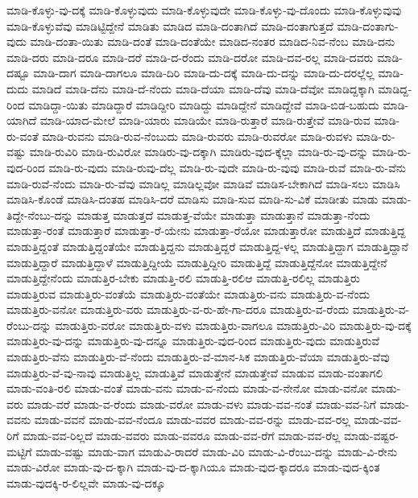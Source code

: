 {ಮಾಡಿ-ಕೊಳ್ಳು-ವು-ದಕ್ಕೆ
ಮಾಡಿ-ಕೊಳ್ಳುವುದು
ಮಾಡಿ-ಕೊಳ್ಳುವುದೇ
ಮಾಡಿ-ಕೊಳ್ಳು-ವು-ದೊಂದು
ಮಾಡಿ-ಕೊಳ್ಳುವುವು
ಮಾಡಿ-ಕೊಳ್ಳುವೆವು
ಮಾಡಿಟ್ಟಿದ್ದೇನೆ
ಮಾಡಿತು
ಮಾಡಿದ
ಮಾಡಿ-ದಂತಾಗಿದೆ
ಮಾಡಿ-ದಂತಾಗುತ್ತದೆ
ಮಾಡಿ-ದಂತಾಗು-ವುದು
ಮಾಡಿ-ದಂತಾ-ಯಿತು
ಮಾಡಿ-ದಂತೆ
ಮಾಡಿ-ದಂತೆಯೇ
ಮಾಡಿದ-ನಂತರ
ಮಾಡಿದ-ನಿವ-ನೆಂಬ
ಮಾಡಿ-ದನು
ಮಾಡಿ-ದರು
ಮಾಡಿ-ದರೂ
ಮಾಡಿ-ದರೆ
ಮಾಡಿ-ದ-ರೆಂದು
ಮಾಡಿ-ದರೋ
ಮಾಡಿ-ದವ-ರಲ್ಲ
ಮಾಡಿ-ದವರು
ಮಾಡಿ-ದಷ್ಟೂ
ಮಾಡಿ-ದಾಗ
ಮಾಡಿ-ದಾಗಲೂ
ಮಾಡಿ-ದಿರಿ
ಮಾಡಿ-ದು-ದಕ್ಕೆ
ಮಾಡಿ-ದು-ದನ್ನು
ಮಾಡಿ-ದು-ದರಲ್ಲೆಲ್ಲ
ಮಾಡಿ-ದುದು
ಮಾಡಿದೆ
ಮಾಡಿ-ದೆನು
ಮಾಡಿ-ದೆ-ನೆಂದು
ಮಾಡಿ-ದೆಯಾ
ಮಾಡಿ-ದೆವು
ಮಾಡಿ-ದೆವೋ
ಮಾಡಿದ್ದಕ್ಕಾಗಿ
ಮಾಡಿದ್ದ-ರಿಂದ
ಮಾಡಿದ್ದಾ-ಯಿತು
ಮಾಡಿದ್ದಾರೆ
ಮಾಡಿದ್ದೀರಿ
ಮಾಡಿದ್ದು
ಮಾಡಿದ್ದೇನೆ
ಮಾಡಿದ್ದೇವೆ
ಮಾಡಿ-ಬಿಡ-ಬಹುದು
ಮಾಡಿ-ಯಾಗಿದೆ
ಮಾಡಿ-ಯಾದ-ಮೇಲೆ
ಮಾಡಿ-ಯಾರು
ಮಾಡಿಯೇ
ಮಾಡಿ-ರುತ್ತಾರೆ
ಮಾಡಿ-ರುತ್ತೇವೆ
ಮಾಡಿ-ರುವ
ಮಾಡಿ-ರು-ವಂತೆ
ಮಾಡಿ-ರುವನು
ಮಾಡಿ-ರುವ-ನೆಂಬುದು
ಮಾಡಿ-ರುವರು
ಮಾಡಿ-ರುವರೋ
ಮಾಡಿ-ರುವಳು
ಮಾಡಿ-ರು-ವಷ್ಟು
ಮಾಡಿ-ರುವಿರಿ
ಮಾಡಿ-ರುವಿರೋ
ಮಾಡಿರು-ವು-ದಕ್ಕಾಗಿ
ಮಾಡಿರು-ವುದ-ಕ್ಕೆಲ್ಲಾ
ಮಾಡಿ-ರು-ವು-ದನ್ನು
ಮಾಡಿ-ರು-ವುದ-ರಿಂದ
ಮಾಡಿ-ರು-ವುದು
ಮಾಡಿ-ರುವು-ದೆಲ್ಲ
ಮಾಡಿ-ರು-ವುದೇ
ಮಾಡಿ-ರು-ವುವು
ಮಾಡಿ-ರುವೆ
ಮಾಡಿ-ರು-ವೆನು
ಮಾಡಿ-ರುವೆ-ನೆಂದು
ಮಾಡಿ-ರು-ವೆವು
ಮಾಡಿಲ್ಲ
ಮಾಡಿಲ್ಲವೋ
ಮಾಡಿವೆ
ಮಾಡಿಸ-ಬೇಕಾಗಿದೆ
ಮಾಡಿ-ಸಲು
ಮಾಡಿಸಿ
ಮಾಡಿಸಿ-ಕೊಂಡೆ
ಮಾಡಿಸಿ-ದಂತಹ
ಮಾಡಿಸಿ-ದರೆ
ಮಾಡಿಸು
ಮಾಡಿ-ಸುವ
ಮಾಡಿ-ಸು-ವಿಕೆ
ಮಾಡೀತು
ಮಾಡು
ಮಾಡು-ತಿದ್ದೇ-ನೆಂಬು-ದನ್ನು
ಮಾಡುತ್ತ
ಮಾಡುತ್ತದೆ
ಮಾಡುತ್ತ-ವೆಯೇ
ಮಾಡುತ್ತಾ
ಮಾಡುತ್ತಾನೆ
ಮಾಡುತ್ತಾ-ನೆಂದು
ಮಾಡುತ್ತಾ-ರಂತೆ
ಮಾಡುತ್ತಾರೆ
ಮಾಡುತ್ತಾ-ರೆ-ಯೇನು
ಮಾಡುತ್ತಾ-ರೆಯೋ
ಮಾಡುತ್ತಾರೋ
ಮಾಡುತ್ತಿದೆ
ಮಾಡುತ್ತಿದ್ದ
ಮಾಡುತ್ತಿದ್ದಂತೆ
ಮಾಡುತ್ತಿದ್ದಂತೆಯೇ
ಮಾಡುತ್ತಿದ್ದನು
ಮಾಡುತ್ತಿದ್ದರೆ
ಮಾಡುತ್ತಿದ್ದ-ಳಲ್ಲ
ಮಾಡುತ್ತಿದ್ದಾಗ
ಮಾಡುತ್ತಿದ್ದಾನೆ
ಮಾಡುತ್ತಿದ್ದಾರೆ
ಮಾಡುತ್ತಿದ್ದಾಳೆ
ಮಾಡುತ್ತಿದ್ದೀಯೆ
ಮಾಡುತ್ತಿದ್ದೀರಿ
ಮಾಡುತ್ತಿದ್ದೆ
ಮಾಡುತ್ತಿದ್ದೆನೋ
ಮಾಡುತ್ತಿದ್ದೇನೆ
ಮಾಡುತ್ತಿದ್ದೇನೆಂದು
ಮಾಡುತ್ತಿರ-ಬೇಕು
ಮಾಡುತ್ತಿ-ರಲಿ
ಮಾಡುತ್ತಿ-ರಲಿಆ
ಮಾಡುತ್ತಿ-ರಲಿಲ್ಲ
ಮಾಡುತ್ತಿರು
ಮಾಡುತ್ತಿರುವ
ಮಾಡುತ್ತಿರು-ವಂತೆಯೆ
ಮಾಡುತ್ತಿರು-ವಂತೆಯೇ
ಮಾಡುತ್ತಿರು-ವನು
ಮಾಡುತ್ತಿರು-ವ-ನೆಂದು
ಮಾಡುತ್ತಿರು-ವನೋ
ಮಾಡುತ್ತಿರು-ವರು
ಮಾಡುತ್ತಿರು-ವ-ರು-ಹೇ-ಗಾ-ದರೂ
ಮಾಡುತ್ತಿರು-ವ-ರೆಂದು
ಮಾಡುತ್ತಿರು-ವ-ರೆಂಬು-ದನ್ನು
ಮಾಡುತ್ತಿರು-ವರೋ
ಮಾಡುತ್ತಿರು-ವಳು
ಮಾಡುತ್ತಿರು-ವಾಗಲೂ
ಮಾಡುತ್ತಿರು-ವಿರಿ
ಮಾಡುತ್ತಿರು-ವು-ದಕ್ಕೆ
ಮಾಡುತ್ತಿರು-ವು-ದನ್ನು
ಮಾಡುತ್ತಿರು-ವು-ದನ್ನೂ
ಮಾಡುತ್ತಿರು-ವುದ-ರಿಂದ
ಮಾಡುತ್ತಿರು-ವುದು
ಮಾಡುತ್ತಿರುವೆ
ಮಾಡುತ್ತಿರು-ವೆನು
ಮಾಡುತ್ತಿರು-ವೆ-ನೆಂದು
ಮಾಡುತ್ತಿರು-ವೆ-ಮಾನ-ಸಿಕ
ಮಾಡುತ್ತಿರು-ವೆಯಾ
ಮಾಡುತ್ತಿರು-ವೆವು
ಮಾಡುತ್ತಿರು-ವೆ-ವು-ನಾವು
ಮಾಡುತ್ತಿಲ್ಲ
ಮಾಡುತ್ತಿವೆ
ಮಾಡುತ್ತೇನೆ
ಮಾಡುತ್ತೇವೆ
ಮಾಡುವ
ಮಾಡು-ವಂತಾಗಲಿ
ಮಾಡು-ವಂತಿ-ರಲಿ
ಮಾಡು-ವಂತೆ
ಮಾಡು-ವನು
ಮಾಡು-ವ-ನೆಂದು
ಮಾಡು-ವ-ನೇನೋ
ಮಾಡು-ವನೋ
ಮಾಡು-ವರು
ಮಾಡು-ವರೆ
ಮಾಡು-ವ-ರೆಂದು
ಮಾಡು-ವರೋ
ಮಾಡು-ವಳು
ಮಾಡು-ವವ-ನಂತೆ
ಮಾಡು-ವವ-ನಿಗೆ
ಮಾಡು-ವವನು
ಮಾಡು-ವವನೆ
ಮಾಡು-ವವ-ನೆಂದೂ
ಮಾಡು-ವವರ
ಮಾಡು-ವವ-ರನ್ನು
ಮಾಡು-ವವ-ರಲ್ಲ
ಮಾಡು-ವವ-ರಿಗೆ
ಮಾಡು-ವವ-ರಿಲ್ಲದೆ
ಮಾಡು-ವವರು
ಮಾಡು-ವವರೂ
ಮಾಡು-ವವ-ರೆಗೆ
ಮಾಡು-ವವ-ರೆಲ್ಲ
ಮಾಡು-ವಷ್ಟರ-ಮಟ್ಟಿಗೆ
ಮಾಡು-ವಷ್ಟು
ಮಾಡು-ವಾಗ
ಮಾಡುವಿ-ರಾದರೆ
ಮಾಡು-ವಿರಿ
ಮಾಡು-ವಿ-ರೆಂಬು-ದನ್ನು
ಮಾಡು-ವಿ-ರೇನು
ಮಾಡು-ವಿರೋ
ಮಾಡು-ವು-ದ-ಕ್ಕಾಗಿ
ಮಾಡು-ವು-ದ-ಕ್ಕಾಗಿಯೂ
ಮಾಡು-ವುದ-ಕ್ಕಾದರೂ
ಮಾಡು-ವುದ-ಕ್ಕಿಂತ
ಮಾಡು-ವುದಕ್ಕಿ-ರ-ಲಿಲ್ಲವೇ
ಮಾಡು-ವು-ದಕ್ಕೂ
}
